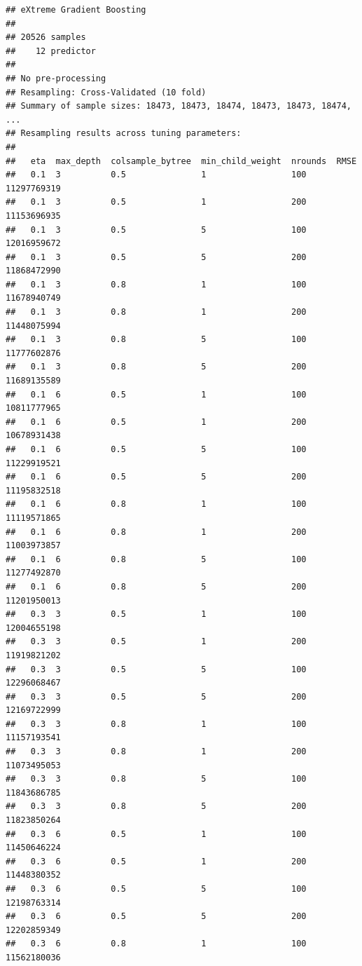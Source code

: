 \documentclass[11pt,]{article}
\begin{document}
\begin{verbatim}
## eXtreme Gradient Boosting 
## 
## 20526 samples
##    12 predictor
## 
## No pre-processing
## Resampling: Cross-Validated (10 fold) 
## Summary of sample sizes: 18473, 18473, 18474, 18473, 18473, 18474, ... 
## Resampling results across tuning parameters:
## 
##   eta  max_depth  colsample_bytree  min_child_weight  nrounds  RMSE       
##   0.1  3          0.5               1                 100      11297769319
##   0.1  3          0.5               1                 200      11153696935
##   0.1  3          0.5               5                 100      12016959672
##   0.1  3          0.5               5                 200      11868472990
##   0.1  3          0.8               1                 100      11678940749
##   0.1  3          0.8               1                 200      11448075994
##   0.1  3          0.8               5                 100      11777602876
##   0.1  3          0.8               5                 200      11689135589
##   0.1  6          0.5               1                 100      10811777965
##   0.1  6          0.5               1                 200      10678931438
##   0.1  6          0.5               5                 100      11229919521
##   0.1  6          0.5               5                 200      11195832518
##   0.1  6          0.8               1                 100      11119571865
##   0.1  6          0.8               1                 200      11003973857
##   0.1  6          0.8               5                 100      11277492870
##   0.1  6          0.8               5                 200      11201950013
##   0.3  3          0.5               1                 100      12004655198
##   0.3  3          0.5               1                 200      11919821202
##   0.3  3          0.5               5                 100      12296068467
##   0.3  3          0.5               5                 200      12169722999
##   0.3  3          0.8               1                 100      11157193541
##   0.3  3          0.8               1                 200      11073495053
##   0.3  3          0.8               5                 100      11843686785
##   0.3  3          0.8               5                 200      11823850264
##   0.3  6          0.5               1                 100      11450646224
##   0.3  6          0.5               1                 200      11448380352
##   0.3  6          0.5               5                 100      12198763314
##   0.3  6          0.5               5                 200      12202859349
##   0.3  6          0.8               1                 100      11562180036

\end{verbatim}
\end{document}
